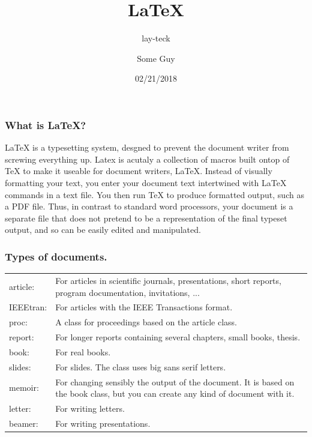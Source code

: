 \documentclass{beamer}
\title{\LaTeX}
\subtitle{lay-teck}
\author{Some Guy}
\institute{Linux@APP}
\date{02/21/2018}
\begin{document}
\frame{\titlepage}
\begin{frame}
\frametitle{What is \LaTeX?}
LaTeX is a typesetting system, desgned to prevent the document writer from screwing everything up.
Latex is acutaly a collection of macros built ontop of TeX to make it useable for document writers, LaTeX. Instead of visually formatting your text, you enter your document text intertwined with LaTeX commands in a text file. You then run TeX to produce formatted output, such as a PDF file. Thus, in contrast to standard word processors, your document is a separate file that does not pretend to be a representation of the final typeset output, and so can be easily edited and manipulated. 

\end{frame}
\begin{frame}[fragile]
\frametitle{Types of documents.}
\renewcommand*{\arraystretch}{1.4}
\begin{longtable}{l p{3 in}}
article: &     For articles in scientific journals, presentations, short reports, program documentation, invitations, ... \\
IEEEtran: &    For articles with the IEEE Transactions format. \\
proc: &        A class for proceedings based on the article class. \\
report: &      For longer reports containing several chapters, small books, thesis. \\
book: &        For real books. \\
slides: &      For slides. The class uses big sans serif letters. \\
memoir: &      For changing sensibly the output of the document. It is based on the book class, but you can create any kind of document with it. \\
letter: &      For writing letters. \\
beamer: &      For writing presentations. \\
\end{longtable}
\end{frame}
\end{document}

